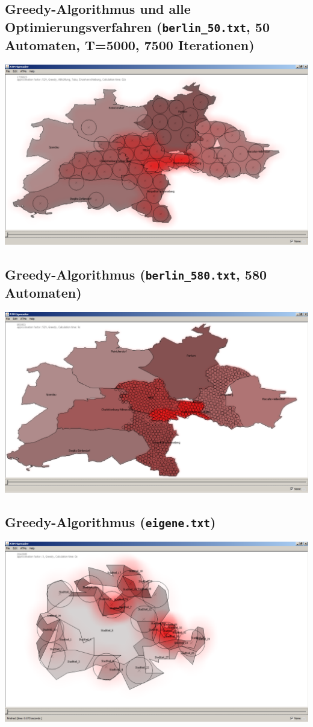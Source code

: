 \documentclass[12pt,a4paper]{article}
\begin{document}
\subsection{Greedy-Algorithmus und alle Optimierungsverfahren (\texttt{berlin\_50.txt}, 50 Automaten, T=5000, 7500 Iterationen)}
\includegraphics[width=1.0\textwidth]{berlin50_alles.pdf}

\subsection{Greedy-Algorithmus (\texttt{berlin\_580.txt}, 580 Automaten)}
\includegraphics[width=1.0\textwidth]{berlin580_greedy.pdf}

\subsection{Greedy-Algorithmus (\texttt{eigene.txt})}
\includegraphics[width=1.0\textwidth]{eigene_greedy.pdf}
\end{document}
